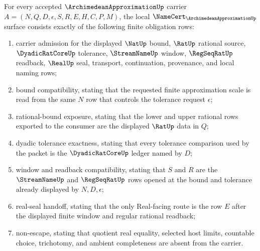 \begin{theorem}
\label{thm:archimedean-approximation-namecert-obligations}
For every accepted $\ArchimedeanApproximationUp$ carrier
$A=(N,Q,D,\epsilon,S,R,E,H,C,P,M)$, the local
$\NameCert_{\ArchimedeanApproximationUp}$ surface consists exactly of the
following finite obligation rows:
\begin{enumerate}
\item carrier admission for the displayed $\NatUp$ bound, $\RatUp$ rational source, $\DyadicRatCoreUp$ tolerance, $\StreamNameUp$ window, $\RegSeqRatUp$ readback, $\RealUp$ seal, transport, continuation, provenance, and local naming rows;
\item bound compatibility, stating that the requested finite approximation scale is read from the same $N$ row that controls the tolerance request $\epsilon$;
\item rational-bound exposure, stating that the lower and upper rational rows exported to the consumer are the displayed $\RatUp$ data in $Q$;
\item dyadic tolerance exactness, stating that every tolerance comparison used by the packet is the $\DyadicRatCoreUp$ ledger named by $D$;
\item window and readback compatibility, stating that $S$ and $R$ are the $\StreamNameUp$ and $\RegSeqRatUp$ rows opened at the bound and tolerance already displayed by $N,D,\epsilon$;
\item real-seal handoff, stating that the only Real-facing route is the row $E$ after the displayed finite window and regular rational readback;
\item non-escape, stating that quotient real equality, selected host limits, countable choice, trichotomy, and ambient completeness are absent from the carrier.
\end{enumerate}
\end{theorem}
